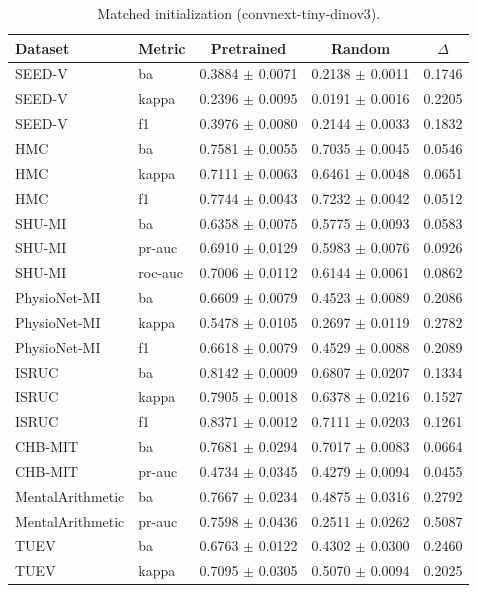 \begin{table}[tbp]\centering\scriptsize\caption{Matched initialization (convnext-tiny-dinov3).}\begin{tabular}{@{}l l c c c@{}}\toprule Dataset & Metric & Pretrained & Random & $\Delta$ \\ \midrule
SEED-V & ba & 0.3884 $\pm$ 0.0071 & 0.2138 $\pm$ 0.0011 & 0.1746 \\
SEED-V & kappa & 0.2396 $\pm$ 0.0095 & 0.0191 $\pm$ 0.0016 & 0.2205 \\
SEED-V & f1 & 0.3976 $\pm$ 0.0080 & 0.2144 $\pm$ 0.0033 & 0.1832 \\
HMC & ba & 0.7581 $\pm$ 0.0055 & 0.7035 $\pm$ 0.0045 & 0.0546 \\
HMC & kappa & 0.7111 $\pm$ 0.0063 & 0.6461 $\pm$ 0.0048 & 0.0651 \\
HMC & f1 & 0.7744 $\pm$ 0.0043 & 0.7232 $\pm$ 0.0042 & 0.0512 \\
SHU-MI & ba & 0.6358 $\pm$ 0.0075 & 0.5775 $\pm$ 0.0093 & 0.0583 \\
SHU-MI & pr-auc & 0.6910 $\pm$ 0.0129 & 0.5983 $\pm$ 0.0076 & 0.0926 \\
SHU-MI & roc-auc & 0.7006 $\pm$ 0.0112 & 0.6144 $\pm$ 0.0061 & 0.0862 \\
PhysioNet-MI & ba & 0.6609 $\pm$ 0.0079 & 0.4523 $\pm$ 0.0089 & 0.2086 \\
PhysioNet-MI & kappa & 0.5478 $\pm$ 0.0105 & 0.2697 $\pm$ 0.0119 & 0.2782 \\
PhysioNet-MI & f1 & 0.6618 $\pm$ 0.0079 & 0.4529 $\pm$ 0.0088 & 0.2089 \\
ISRUC & ba & 0.8142 $\pm$ 0.0009 & 0.6807 $\pm$ 0.0207 & 0.1334 \\
ISRUC & kappa & 0.7905 $\pm$ 0.0018 & 0.6378 $\pm$ 0.0216 & 0.1527 \\
ISRUC & f1 & 0.8371 $\pm$ 0.0012 & 0.7111 $\pm$ 0.0203 & 0.1261 \\
CHB-MIT & ba & 0.7681 $\pm$ 0.0294 & 0.7017 $\pm$ 0.0083 & 0.0664 \\
CHB-MIT & pr-auc & 0.4734 $\pm$ 0.0345 & 0.4279 $\pm$ 0.0094 & 0.0455 \\
MentalArithmetic & ba & 0.7667 $\pm$ 0.0234 & 0.4875 $\pm$ 0.0316 & 0.2792 \\
MentalArithmetic & pr-auc & 0.7598 $\pm$ 0.0436 & 0.2511 $\pm$ 0.0262 & 0.5087 \\
TUEV & ba & 0.6763 $\pm$ 0.0122 & 0.4302 $\pm$ 0.0300 & 0.2460 \\
TUEV & kappa & 0.7095 $\pm$ 0.0305 & 0.5070 $\pm$ 0.0094 & 0.2025 \\

\end{tabular}
\end{table}
